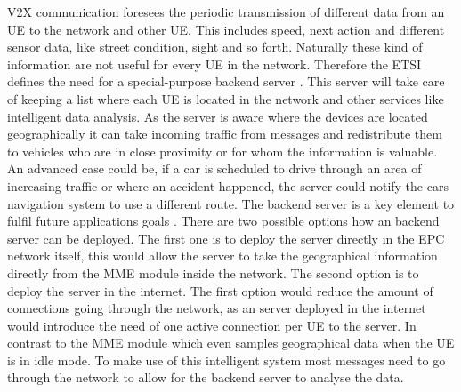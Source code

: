 \documentclass[conference,12pt,onecolumn]{IEEEtran}
\begin{document}
V2X communication foresees the periodic transmission of different data from an UE to the network and other UE. This includes speed, next action and different sensor data, like street condition, sight and so forth. Naturally these kind of information are not useful for every UE in the network. Therefore the ETSI defines the need for a special-purpose backend server \cite{araniti2013}. This server will take care of keeping a list where each UE is located in the network and other services like intelligent data analysis. As the server is aware where the devices are located geographically it can take incoming traffic from messages and redistribute them to vehicles who are in close proximity or for whom the information is valuable. An advanced case could be, if a car is scheduled to drive through an area of increasing traffic or where an accident happened, the server could notify the cars navigation system to use a different route. The backend server is a key element to fulfil future applications goals \cite{araniti2013}. There are two possible options how an backend server can be deployed. The first one is to deploy the server directly in the EPC network itself, this would allow the server to take the geographical information directly from the MME module inside the network. The second option is to deploy the server in the internet. The first option would reduce the amount of connections going through the network, as an server deployed in the internet would introduce the need of one active connection per UE to the server. In contrast to the MME module which even samples geographical data when the UE is in idle mode. To make use of this intelligent system most messages need to go through the network \cite{araniti2013} to allow for the backend server to analyse the data.
\end{document}
